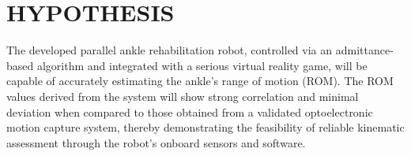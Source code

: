 \chapter{HYPOTHESIS}\label{HYPOTHESIS}

The developed parallel ankle rehabilitation robot, controlled via an admittance-based algorithm and integrated with a serious virtual reality game, will be capable of accurately estimating the ankle's range of motion (ROM). The ROM values derived from the system will show strong correlation and minimal deviation when compared to those obtained from a validated optoelectronic motion capture system, thereby demonstrating the feasibility of reliable kinematic assessment through the robot’s onboard sensors and software.